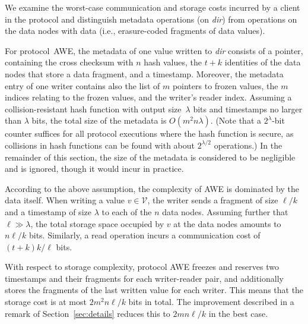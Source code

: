 \documentclass[oribibl]{llncs}
\theoremstyle{definition-boldhead}
\newcommand{\var}[1]{\textit{#1}}
\newcommand{\values}{\ensuremath{\mathcal{V}}\xspace}
\newcommand{\dir}{\var{dir}\xspace}
\newcommand{\NAME}{AWE\xspace}
\newcommand{\nodes}{nodes\xspace}
\begin{document}
We examine the worst-case communication and storage costs incurred by
a client in the protocol and distinguish metadata operations (on \dir)
from operations on the data \nodes with data (i.e., erasure-coded
fragments of data values).

For protocol~\NAME, the metadata of one value written to \dir consists
of a pointer, containing the cross checksum with $n$ hash values, the
$t+k$ identities of the data \nodes that store a data fragment, and a
timestamp.  Moreover, the metadata entry of one writer contains also
the list of $m$ pointers to frozen values, the $m$ indices relating to
the frozen values, and the writer's reader index.  Assuming a
collision-resistant hash function with output size~$\lambda$ bits and
timestamps no larger than $\lambda$ bits, the total size of the
metadata is $O(m^2 n \lambda)$.  (Note that a $2^\lambda$-bit counter
suffices for all protocol executions where the hash function is
secure, as collisions in hash functions can be found with about
$2^{\lambda/2}$ operations.)  In the remainder of this section, the
size of the metadata is considered to be negligible and is ignored,
though it would incur in practice.

According to the above assumption, the complexity of \NAME is
dominated by the data itself.  When writing a value $v \in \values$,
the writer sends a fragment of size $\ell/k$ and a timestamp of size
$\lambda$ to each of the $n$ data \nodes.  Assuming further that $\ell
\gg \lambda$, the total storage space occupied by $v$ at the data
\nodes amounts to $n \ell / k$ bits.  Similarly, a read operation
incurs a communication cost of $(t+k) k / \ell$ bits.

With respect to storage complexity, protocol \NAME freezes and
reserves two timestamps and their fragments for each writer-reader
pair, and additionally stores the fragments of the last written value
for each writer.  This means that the storage cost is at most $2 m^2 n
\ell / k$ bits in total.  The improvement described in a remark of
Section~\ref{sec:details} reduces this to $2 m n \ell / k$ in the best
case.
\end{document}
